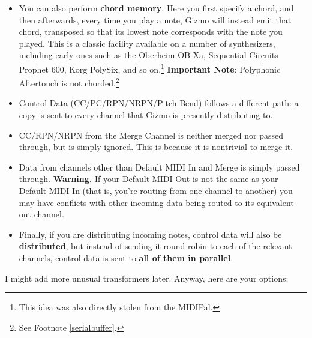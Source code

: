 \documentclass{article}
\begin{document}
\begin{itemize}
\item You can also perform {\bf chord memory}.  Here you first specify a chord, and then afterwards, every time you play a note, Gizmo will instead emit that chord, transposed so that its lowest note corresponds with the note you played.  This is a classic facility available on a number of synthesizers, including early ones such as the Oberheim OB-Xa, Sequential Circuits Prophet 600, Korg PolySix, and so on.\footnote{This idea was also directly stolen from the MIDIPal.}   {\bf Important Note}: Polyphonic Aftertouch is not chorded.\footnote{See Footnote \ref{serialbuffer}.}

\item Control Data (CC/PC/RPN/NRPN/Pitch Bend) follows a different path: a copy is sent to every channel that Gizmo is presently distributing to.  

\item CC/RPN/NRPN from the Merge Channel is neither merged nor passed through, but is simply ignored.  This is because it is nontrivial to merge it.

\item Data from channels other than Default MIDI In and Merge is simply passed through.  {\bf Warning.}  If your Default MIDI Out is not the same as your Default MIDI In (that is, you're routing from one channel to another) you may have conflicts with other incoming data being routed to its equivalent out channel.

\item Finally, if you are distributing incoming notes, control data will also be {\bf distributed}, but instead of sending it round-robin to each of the relevant channels, control data is sent to {\bf all of them in parallel}.

\end{itemize}

I might add more unusual transformers later.  Anyway, here are your options:
\end{document}
